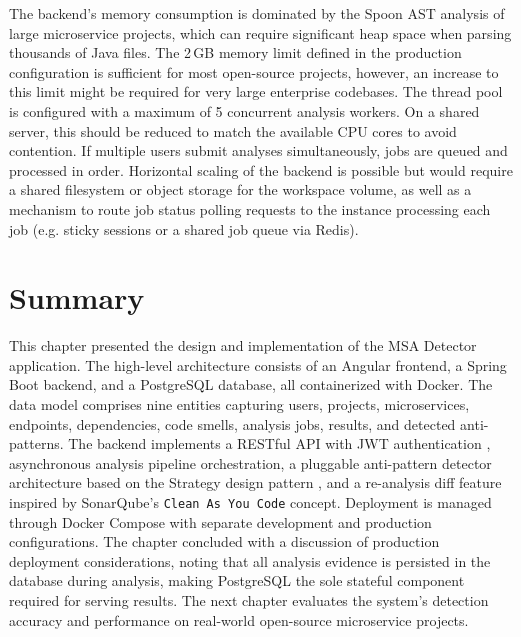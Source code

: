 \par The backend's memory consumption is dominated by the Spoon AST analysis of large microservice projects, which can require significant heap space when parsing thousands of Java files. The 2\,GB memory limit defined in the production configuration is sufficient for most open-source projects, however, an increase to this limit might be required for very large enterprise codebases. The thread pool is configured with a maximum of 5 concurrent analysis workers. On a shared server, this should be reduced to match the available CPU cores to avoid contention. If multiple users submit analyses simultaneously, jobs are queued and processed in order. Horizontal scaling of the backend is possible but would require a shared filesystem or object storage for the workspace volume, as well as a mechanism to route job status polling requests to the instance processing each job (e.g. sticky sessions or a shared job queue via Redis).

\section{Summary}
\label{sec:ch4-summary}

\par This chapter presented the design and implementation of the MSA Detector application. The high-level architecture consists of an Angular frontend, a Spring Boot backend, and a PostgreSQL database, all containerized with Docker. The data model comprises nine entities capturing users, projects, microservices, endpoints, dependencies, code smells, analysis jobs, results, and detected anti-patterns. The backend implements a RESTful API \cite{Fielding2000} with JWT authentication \cite{RFC7519}, asynchronous analysis pipeline orchestration, a pluggable anti-pattern detector architecture based on the Strategy design pattern \cite{Gamma1994}, and a re-analysis diff feature inspired by SonarQube's \texttt{Clean As You Code} concept. Deployment is managed through Docker Compose with separate development and production configurations. The chapter concluded with a discussion of production deployment considerations, noting that all analysis evidence is persisted in the database during analysis, making PostgreSQL the sole stateful component required for serving results. The next chapter evaluates the system's detection accuracy and performance on real-world open-source microservice projects.